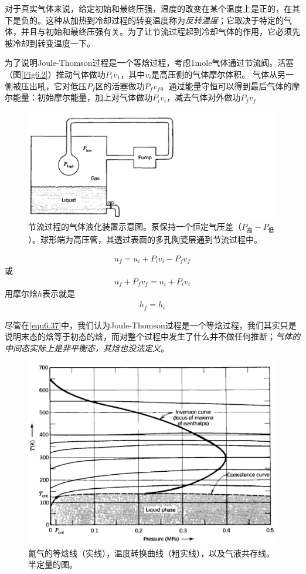 对于真实气体来说，给定初始和最终压强，温度的改变在某个温度上是正的，在其下是负的。这种从加热到冷却过程的转变温度称为{\it 反转温度}；它取决于特定的气体，并且与初始和最终压强有关。为了让节流过程起到冷却气体的作用，它必须先被冷却到转变温度一下。

为了说明Joule-Thomson过程是一个等焓过程，考虑1mole气体通过节流阀。活塞（图\ref{Fig6.2}）推动气体做功$P_iv_1$，其中$v_i$是高压侧的气体摩尔体积。%
气体从另一侧被压出吼，它对低压$P_f$区的活塞做功$P_fv_f$。通过能量守恒可以得到最后气体的摩尔能量：初始摩尔能量，加上对气体做功$P_iv_i$，减去气体对外做功$P_fv_f$

\begin{figure}[htbp]
\includegraphics[width = .8\textwidth]{./../Pictures/fig6.3.png}
\caption{节流过程的气体液化装置示意图。泵保持一个恒定气压差（$P_{\text{高}}-P_{\text{低}}$）。球形端为高压管，其透过表面的多孔陶瓷层通到节流过程中。}\label{Fig6.3}
\end{figure}

\begin{align}\label{equ6.35}
u_f=u_i+P_iv_i-P_fv_f
\end{align}
或
\begin{align}\label{equ6.36}
u_f+P_fv_f=u_i+P_iv_i
\end{align}
用摩尔焓$h$表示就是
\begin{align}\label{equ6.37}
h_f=h_i
\end{align}

尽管在\eqref{equ6.37}中，我们认为Joule-Thomson过程是一个等焓过程，我们其实只是说明末态的焓等于初态的焓，而对整个过程中发生了什么并不做任何推断；{\it 气体的中间态实际上是非平衡态，其焓也没法定义}。

\begin{figure}[h]
\includegraphics[width = .8\textwidth]{./../Pictures/fig6.4.png}
\caption{氮气的等焓线（实线），温度转换曲线（粗实线），以及气液共存线。半定量的图。}\label{Fig6.4}
\end{figure}

